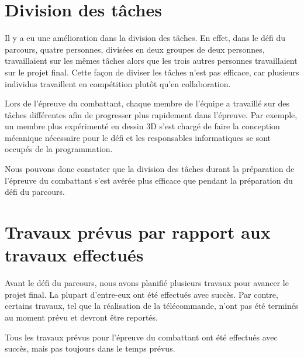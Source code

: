 \section{Division des tâches}

\begin{spacing}{1.5}
    Il y a eu une amélioration dans la division des tâches.
    En effet, dans le défi du parcours, quatre personnes, divisées en deux groupes de deux personnes, travaillaient sur les mêmes tâches alors que les trois autres personnes travaillaient sur le projet final.
    Cette façon de diviser les tâches n'est pas efficace, car plusieurs individus travaillent en compétition plutôt qu'en collaboration.
\end{spacing}

\begin{spacing}{1.5}
    Lors de l'épreuve du combattant, chaque membre de l'équipe a travaillé sur des tâches différentes afin de progresser plus rapidement dans l'épreuve.
    Par exemple, un membre plus expérimenté en dessin 3D s'est chargé de faire la conception mécanique nécessaire pour le défi et les responsables informatiques se sont occupés de la programmation.
\end{spacing}

\begin{spacing}{1.5}
    Nous pouvons donc constater que la division des tâches durant la préparation de l'épreuve du combattant s'est avérée plus efficace que pendant la préparation du défi du parcours.
\end{spacing}

\section{Travaux prévus par rapport aux travaux effectués}

\begin{spacing}{1.5}
    Avant le défi du parcours, nous avons planifié plusieurs travaux pour avancer le projet final.
    La plupart d'entre-eux ont été effectués avec succès.
    Par contre, certains travaux, tel que la réalisation de la télécommande, n'ont pas été terminés au moment prévu et devront être reportés.
\end{spacing}

\begin{spacing}{1.5}
    Tous les travaux prévus pour l'épreuve du combattant ont été effectués avec succès, mais pas toujours dans le temps prévus.
\end{spacing}

